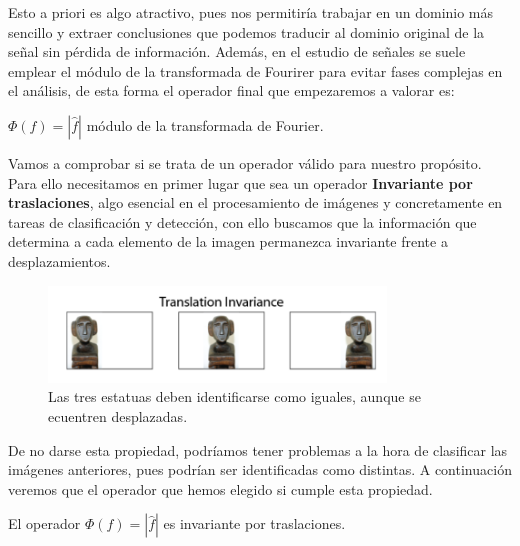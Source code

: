 \medskip

\noindent Esto a priori es algo atractivo, pues nos permitiría trabajar en un dominio más sencillo y extraer conclusiones que podemos traducir al dominio original de la señal sin pérdida de información. Además, en el estudio de señales se suele emplear el módulo de la transformada de Fourirer para evitar fases complejas en el análisis, de esta forma el operador final que empezaremos a valorar es: 

\begin{definicion}
$\Phi(f)=|\widehat{f}|$ módulo de la transformada de Fourier. 
\end{definicion}

\noindent Vamos a comprobar si se trata de un operador válido para nuestro propósito. Para ello necesitamos en primer lugar que sea un operador \textbf{Invariante por traslaciones}, algo esencial en el procesamiento de imágenes y concretamente en tareas de clasificación y detección, con ello buscamos que la información que determina a cada elemento de la imagen permanezca invariante frente a desplazamientos.

\begin{figure} [!h]
    \centering
    \includegraphics[width=0.8\textwidth]{img/translation_invariance.png}
    \caption{Las tres estatuas deben identificarse como iguales, aunque se ecuentren desplazadas.}
    \label{fig:invarianza_traslaciones}
\end{figure}

\medskip

\noindent De no darse esta propiedad, podríamos tener problemas a la hora de clasificar las imágenes anteriores, pues podrían ser identificadas como distintas. A continuación veremos que el operador que hemos elegido si cumple esta propiedad.

\begin{lema}
    El operador $\Phi(f)=|\widehat{f}|$ es invariante por traslaciones.
\end{lema}

